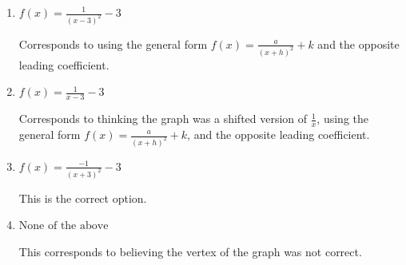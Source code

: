 \documentclass{extbook}[14pt]
\begin{document}
\begin{enumerate}
{\begin{enumerate}[label=\Alph*.]
Corresponds to thinking the graph was a shifted version of $\frac{1}{x}$.
\item \( f(x) = \frac{1}{(x - 3)^2} - 3 \)

Corresponds to using the general form $f(x) = \frac{a}{(x+h)^2}+k$ and the opposite leading coefficient.
\item \( f(x) = \frac{1}{x - 3} - 3 \)

Corresponds to thinking the graph was a shifted version of $\frac{1}{x}$, using the general form $f(x) = \frac{a}{(x+h)^2}+k$, and the opposite leading coefficient.
\item \( f(x) = \frac{-1}{(x + 3)^2} - 3 \)

This is the correct option.
\item \( \text{None of the above} \)

This corresponds to believing the vertex of the graph was not correct.
\end{enumerate}

}
\end{enumerate}
\end{document}
